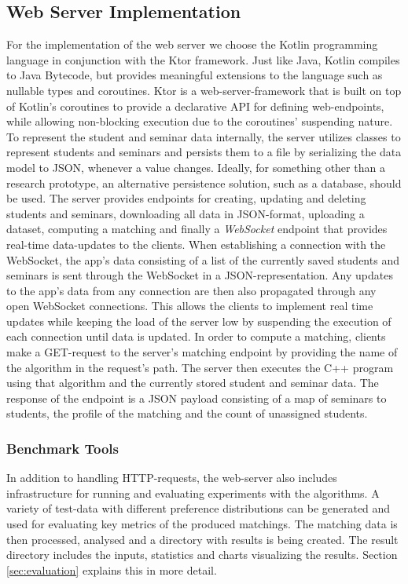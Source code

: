 \subsection{Web Server Implementation}
For the implementation of the web server we choose the Kotlin programming language in conjunction with the Ktor framework. Just like Java, Kotlin compiles to Java Bytecode, but provides meaningful extensions to the language such as nullable types and coroutines. Ktor is a web-server-framework that is built on top of Kotlin's coroutines to provide a declarative API for defining web-endpoints, while allowing non-blocking execution due to the coroutines' suspending nature. 
To represent the student and seminar data internally, the server utilizes classes to represent students and seminars and persists them to a file by serializing the data model to JSON, whenever a value changes. Ideally, for something other than a research prototype, an alternative persistence solution, such as a database, should be used. The server provides endpoints for creating, updating and deleting students and seminars, downloading all data in JSON-format, uploading a dataset, computing a matching and finally a \emph{WebSocket} endpoint that provides real-time data-updates to the clients. When establishing a connection with the WebSocket, the app's data consisting of a list of the currently saved students and seminars is sent through the WebSocket in a JSON-representation. Any updates to the app's data from any connection are then also propagated through any open WebSocket connections. This allows the clients to implement real time updates while keeping the load of the server low by suspending the execution of each connection until data is updated. In order to compute a matching, clients make a GET-request to the server's matching endpoint by providing the name of the algorithm in the request's path. The server then executes the C++ program using that algorithm and the currently stored student and seminar data. The response of the endpoint is a JSON payload consisting of a map of seminars to students, the profile of the matching and the count of unassigned students.

\subsubsection{Benchmark Tools}
In addition to handling HTTP-requests, the web-server also includes infrastructure for running and evaluating experiments with the algorithms. A variety of test-data with different preference distributions can be generated and used for evaluating key metrics of the produced matchings. The matching data is then processed, analysed and a directory with results is being created. The result directory includes the inputs, statistics and charts visualizing the results. Section \ref{sec:evaluation} explains this in more detail.

